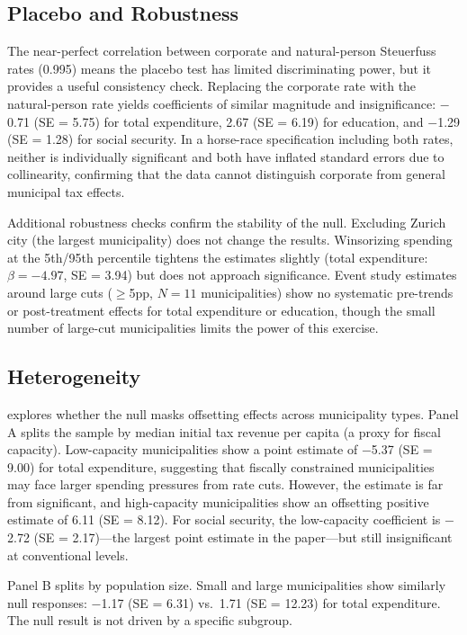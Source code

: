 \documentclass[12pt]{article}
\begin{document}



\subsection{Placebo and Robustness}

The near-perfect correlation between corporate and natural-person Steuerfuss rates (0.995) means the placebo test has limited discriminating power, but it provides a useful consistency check. Replacing the corporate rate with the natural-person rate yields coefficients of similar magnitude and insignificance: $-$0.71 (SE = 5.75) for total expenditure, 2.67 (SE = 6.19) for education, and $-$1.29 (SE = 1.28) for social security. In a horse-race specification including both rates, neither is individually significant and both have inflated standard errors due to collinearity, confirming that the data cannot distinguish corporate from general municipal tax effects.

Additional robustness checks confirm the stability of the null. Excluding Zurich city (the largest municipality) does not change the results. Winsorizing spending at the 5th/95th percentile tightens the estimates slightly (total expenditure: $\beta = -4.97$, SE = 3.94) but does not approach significance. Event study estimates around large cuts ($\geq$5pp, $N = 11$ municipalities) show no systematic pre-trends or post-treatment effects for total expenditure or education, though the small number of large-cut municipalities limits the power of this exercise.


\subsection{Heterogeneity}

 explores whether the null masks offsetting effects across municipality types. Panel A splits the sample by median initial tax revenue per capita (a proxy for fiscal capacity). Low-capacity municipalities show a point estimate of $-$5.37 (SE = 9.00) for total expenditure, suggesting that fiscally constrained municipalities may face larger spending pressures from rate cuts. However, the estimate is far from significant, and high-capacity municipalities show an offsetting positive estimate of 6.11 (SE = 8.12). For social security, the low-capacity coefficient is $-$2.72 (SE = 2.17)---the largest point estimate in the paper---but still insignificant at conventional levels.

Panel B splits by population size. Small and large municipalities show similarly null responses: $-$1.17 (SE = 6.31) vs.\ 1.71 (SE = 12.23) for total expenditure. The null result is not driven by a specific subgroup.
\end{document}
